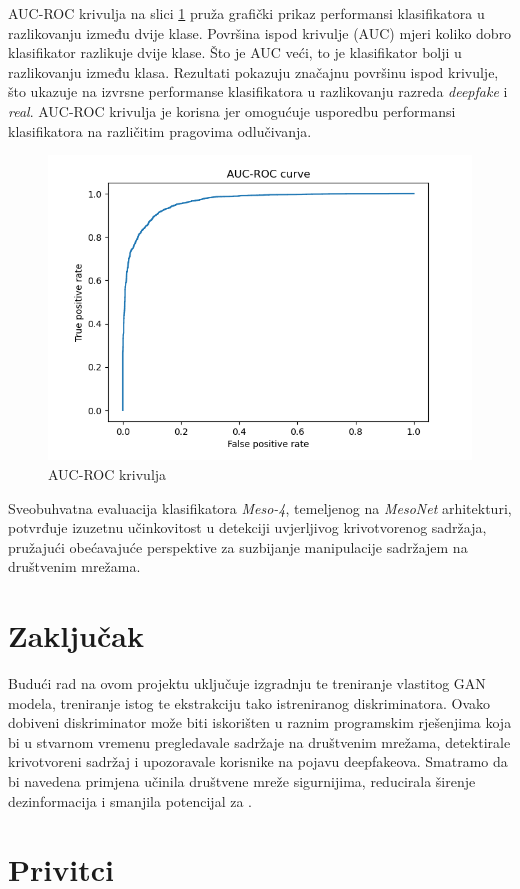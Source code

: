 \documentclass[seminarski, times, utf8]{fer}
\begin{document}
AUC-ROC krivulja na slici \ref{fig:auc} pruža grafički prikaz performansi klasifikatora u razlikovanju između dvije klase. Površina ispod krivulje (AUC) mjeri koliko dobro klasifikator razlikuje dvije klase. Što je AUC veći, to je klasifikator bolji u razlikovanju između klasa. Rezultati pokazuju značajnu površinu ispod krivulje, što ukazuje na izvrsne performanse klasifikatora u razlikovanju razreda \textit{deepfake} i \textit{real}. AUC-ROC krivulja je korisna jer omogućuje usporedbu performansi klasifikatora na različitim pragovima odlučivanja.

\begin{figure}[H]
   \centering
   \includegraphics[width=0.7\linewidth]{slike/auc.png}
   \caption{AUC-ROC krivulja}
   \label{fig:auc}
\end{figure}

Sveobuhvatna evaluacija klasifikatora \textit{Meso-4}, temeljenog na \textit{MesoNet} arhitekturi, potvrđuje izuzetnu učinkovitost u detekciji uvjerljivog krivotvorenog sadržaja, pružajući obećavajuće perspektive za suzbijanje manipulacije sadržajem na društvenim mrežama.


\chapter{Zaključak}
Budući rad na ovom projektu uključuje izgradnju te treniranje vlastitog GAN modela, treniranje istog te ekstrakciju tako istreniranog diskriminatora. Ovako dobiveni diskriminator može biti iskorišten u raznim programskim rješenjima koja bi u stvarnom vremenu pregledavale sadržaje na društvenim mrežama, 
detektirale krivotvoreni sadržaj i upozoravale korisnike na pojavu deepfakeova. Smatramo da bi navedena primjena učinila društvene mreže sigurnijima, reducirala širenje dezinformacija i smanjila potencijal za . 
\label{pog:zakljucak}







\chapter{Privitci}
\end{document}
